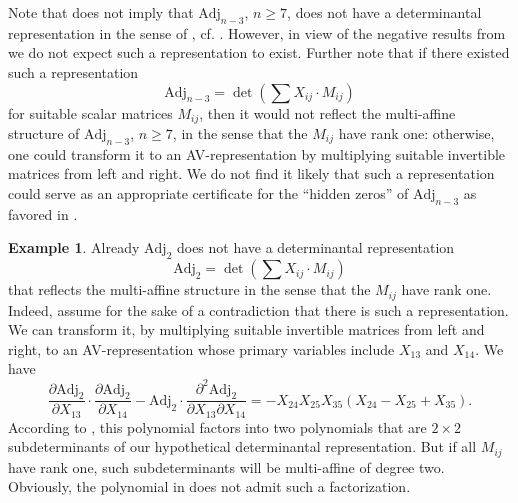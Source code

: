 \documentclass[a4paper,10pt]{amsart}
\theoremstyle{definition}
\newtheorem{ex}[Def]{Example}
\theoremstyle{plain}
\begin{document}
Note that  does not imply that $\mathrm{Adj}_{n-3}$, $n\geq7$, does not have a determinantal representation in the sense of , cf. . However, in view of the negative results from  we do not expect such a representation to exist. Further note that if there existed such a representation
\begin{equation*}
    \mathrm{Adj}_{n-3}=\det\left(\sum X_{ij}\cdot M_{ij}\right)
\end{equation*}
for suitable scalar matrices $M_{ij}$, then it would not reflect the multi-affine structure of $\mathrm{Adj}_{n-3}$, $n\geq7$, in the sense that the $M_{ij}$ have rank one: otherwise, one could transform it to an AV-representation by multiplying suitable invertible matrices from left and right. We do not find it likely that such a representation could serve as an appropriate certificate for the ``hidden zeros'' of $\mathrm{Adj}_{n-3}$ as favored in \cite{arkani2024hidden}.
\begin{ex}
    Already $\mathrm{Adj}_{2}$ does not have a determinantal representation 
    \begin{equation*}
    \mathrm{Adj}_{2}=\det\left(\sum X_{ij}\cdot M_{ij}\right)
    \end{equation*}
     that reflects the multi-affine structure in the sense that the $M_{ij}$ have rank one. Indeed, assume for the sake of a contradiction that there is such a representation. We can transform it, by multiplying suitable invertible matrices from left and right, to an AV-representation whose primary variables include $X_{13}$ and $X_{14}$. We have
     \begin{equation}\label{eq:adj2wronskian}
         \frac{\partial \mathrm{Adj}_{2}}{\partial X_{13}}\cdot \frac{\partial \mathrm{Adj}_{2}}{\partial X_{14}}- \mathrm{Adj}_{2}\cdot \frac{\partial^2 \mathrm{Adj}_{2}}{\partial X_{13}\partial X_{14}}=-X_{24} X_{25} X_{35} (X_{24}-X_{25}+X_{35}).
     \end{equation}
     According to , this polynomial factors into two polynomials that are $2\times2$ subdeterminants of our hypothetical determinantal representation. But if all $M_{ij}$ have rank one, such subdeterminants will  be multi-affine of degree two. Obviously, the polynomial in  does not admit such a factorization.
\end{ex}



\end{document}
